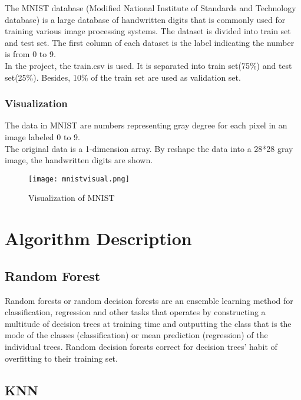\documentclass{article}
\begin{document}
The MNIST database (Modified National Institute of Standards and Technology database) is a large database of handwritten digits that is commonly used for training various image processing systems. The dataset is divided into train set and test set. The first column of each dataset is the label indicating the number is from 0 to 9.\\
In the project, the train.csv is used. It is separated into train set(75\%) and test set(25\%). Besides, 10\% of the train set are used as validation set.

\subsubsection{Visualization}
The data in MNIST are numbers representing gray degree for each pixel in an image labeled 0 to 9.\\
The original data is a 1-dimension array. By reshape the data into a 28*28 gray image, the handwritten digits are shown.\\

\begin{figure}[H]
\centering
\texttt{[image: mnistvisual.png]}
\caption{Visualization of MNIST}
\label{fig2.1}
\end{figure}



\section{Algorithm Description}
\subsection{Random Forest}
Random forests or random decision forests are an ensemble learning method for classification, regression and other tasks that operates by constructing a multitude of decision trees at training time and outputting the class that is the mode of the classes (classification) or mean prediction (regression) of the individual trees. Random decision forests correct for decision trees' habit of overfitting to their training set.



\subsection{KNN}
\end{document}
